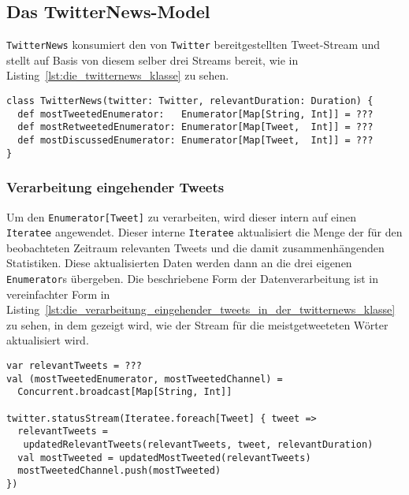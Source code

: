 
\subsection{Das TwitterNews-Model} %
\label{sub:die_twitternews_klasse}

\lstinline|TwitterNews| konsumiert den von \lstinline|Twitter| bereitgestellten Tweet-Stream und stellt auf Basis von diesem selber drei Streams bereit, wie in Listing~\ref{lst:die_twitternews_klasse} zu sehen.

\begin{lstlisting}[caption=Die TwitterNews-Klasse, label=lst:die_twitternews_klasse]
class TwitterNews(twitter: Twitter, relevantDuration: Duration) {
  def mostTweetedEnumerator:   Enumerator[Map[String, Int]] = ???
  def mostRetweetedEnumerator: Enumerator[Map[Tweet,  Int]] = ???
  def mostDiscussedEnumerator: Enumerator[Map[Tweet,  Int]] = ???
}
\end{lstlisting}

\subsubsection{Verarbeitung eingehender Tweets} %
\label{ssub:verarbeitung_eingehender_tweets}

Um den \lstinline|Enumerator[Tweet]| zu verarbeiten, wird dieser intern auf einen \lstinline|Iteratee| angewendet.
Dieser interne \lstinline|Iteratee| aktualisiert die Menge der für den beobachteten Zeitraum relevanten Tweets und die damit zusammenhängenden Statistiken.
Diese aktualisierten Daten werden dann an die drei eigenen \lstinline|Enumerator|s übergeben.
Die beschriebene Form der Datenverarbeitung ist in vereinfachter Form in Listing~\ref{lst:die_verarbeitung_eingehender_tweets_in_der_twitternews_klasse} zu sehen, in dem gezeigt wird, wie der Stream für die meistgetweeteten Wörter aktualisiert wird.

\begin{lstlisting}[caption=Die Verarbeitung eingehender Tweets in der TwitterNews-Klasse, label=lst:die_verarbeitung_eingehender_tweets_in_der_twitternews_klasse]
var relevantTweets = ???
val (mostTweetedEnumerator, mostTweetedChannel) =
  Concurrent.broadcast[Map[String, Int]]

twitter.statusStream(Iteratee.foreach[Tweet] { tweet =>
  relevantTweets =
   updatedRelevantTweets(relevantTweets, tweet, relevantDuration)
  val mostTweeted = updatedMostTweeted(relevantTweets)
  mostTweetedChannel.push(mostTweeted)
})
\end{lstlisting}

